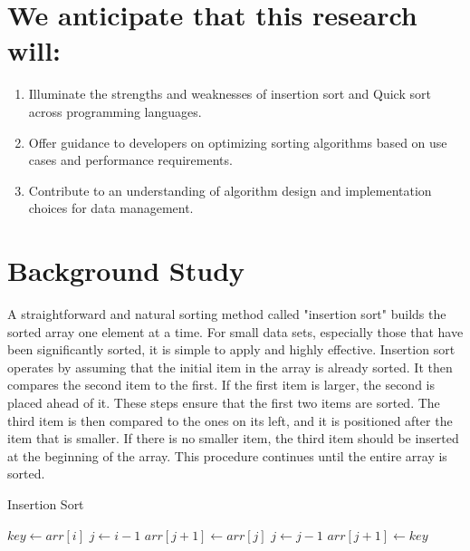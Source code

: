 \documentclass[twocolumn]{article}
\begin{document}
  \vspace{20pt}
  \section*{We anticipate that this research will:}
  \begin{enumerate}
	\item Illuminate the strengths and weaknesses of insertion sort and Quick sort across programming languages.
	
	\item Offer guidance to developers on optimizing sorting algorithms based on use cases and performance requirements.
	
	\item Contribute to an understanding of algorithm design and implementation choices for data management.
  \end{enumerate}
  \cite{2}\cite{3}\cite{4}
\section{Background Study}
A straightforward and natural sorting method called "insertion sort" builds the sorted array one element at a time. For small data sets, especially those that have been significantly sorted, it is simple to apply and highly effective. Insertion sort operates by assuming that the initial item in the array is already sorted. It then compares the second item to the first. If the first item is larger, the second is placed ahead of it. These steps ensure that the first two items are sorted. The third item is then compared to the ones on its left, and it is positioned after the item that is smaller. If there is no smaller item, the third item should be inserted at the beginning of the array. This procedure continues until the entire array is sorted.

\vspace{30pt}
\begin{algorithm}
  \caption{Insertion Sort}
  \begin{algorithmic}[1]
          \State $key \gets arr[i]$
          \State $j \gets i - 1$
              \State $arr[j + 1] \gets arr[j]$
              \State $j \gets j - 1$
          \EndWhile
          \State $arr[j + 1] \gets key$
      \EndFor
  \EndProcedure
  \end{algorithmic}
  \end{algorithm}
  
\end{document}
